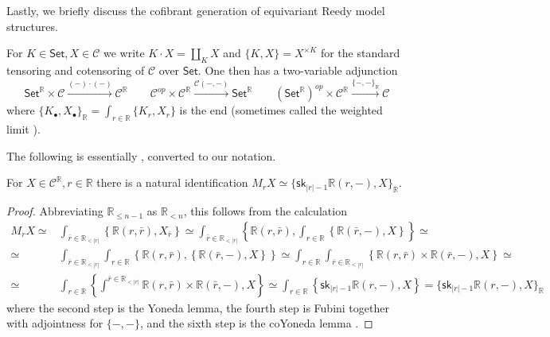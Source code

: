 \documentclass[a4paper,10pt
 ,draft
]{article}%
\begin{document}
Lastly, we briefly discuss the cofibrant generation of equivariant Reedy model structures.

For $K\in \mathsf{Set}, X \in \mathcal{C}$ we write
$K \cdot X = \coprod_K X$ and
$\{K,X\}=X^{\times K}$ for the standard tensoring and cotensoring of $\mathcal{C}$ over $\mathsf{Set}$. One then has a two-variable adjunction
\[
	\mathsf{Set}^{\mathbb{R}} \times \mathcal{C}
	\xrightarrow{(-)\cdot(-)}
	\mathcal{C}^{\mathbb{R}}
\qquad
	\mathcal{C}^{op} \times  \mathcal{C}^{\mathbb{R}}
	\xrightarrow{\mathcal{C}(-,-)}
	\mathsf{Set}^{\mathbb{R}}
\qquad
	\left(\mathsf{Set}^{\mathbb{R}}\right)^{op} \times \mathcal{C}^{\mathbb{R}}
	\xrightarrow{\{-,-\}_{\mathbb{R}}}
	\mathcal{C}
\]
where 
$\{K_{\bullet},X_{\bullet}\}_{\mathbb{R}} =
 \int_{r \in \mathbb{R}} \{K_r,X_r\}$
 is the end (sometimes called the weighted limit \cite[\S 7.1]{Ri14}).



The following is essentially \cite[Lemma 3.5]{RV14}, converted to our notation.


\begin{lemma} For $X \in \mathcal{C}^{\mathbb{R}}, r \in \mathbb{R}$ there is a natural identification
$
M_r X \simeq \{\mathsf{sk}_{|r|-1} \mathbb{R}(r,-),X \}_{\mathbb{R}}
$.
\end{lemma}

\begin{proof}
Abbreviating $\mathbb{R}_{\leq n-1}$ as $\mathbb{R}_{<n}$, this follows from the calculation
\begin{align}
	M_r X 
\simeq &
	\int_{\bar{r} \in \mathbb{R}_{<|r|}} 
\left\{\mathbb{R}(r,\bar{r}),X_{\bar{r}}\right\}
\simeq
	\int_{\bar{r} \in \mathbb{R}_{<|r|}} 
\left\{\mathbb{R}(r,\bar{r}),
	\int_{r \in \mathbb{R}} \left\{\mathbb{R}(\bar{r},-) ,X \right\}\right\}\simeq
\\
\simeq&
	\int_{\bar{r} \in \mathbb{R}_{<|r|}} \int_{r \in \mathbb{R}}
\left\{\mathbb{R}(r,\bar{r}),
	\left\{\mathbb{R}(\bar{r},-) ,X \right\}\right\}
\simeq
	\int_{r \in \mathbb{R}} \int_{\bar{r} \in \mathbb{R}_{<|r|}}
\left\{\mathbb{R}(r,\bar{r})\times \mathbb{R}(\bar{r},-) ,X \right\}\simeq
\\
\simeq &
	\int_{r \in \mathbb{R}} 
\left\{\int^{\bar{r} \in \mathbb{R}_{<|r|}}\mathbb{R}(r,\bar{r})\times \mathbb{R}(\bar{r},-) ,X \right\}
\simeq
	\int_{r \in \mathbb{R}} 
\left\{\mathsf{sk}_{|r|-1} \mathbb{R}(r,-) ,X \right\} =
\{\mathsf{sk}_{|r|-1} \mathbb{R}(r,-),X \}_{\mathbb{R}} 
\end{align}
where the second step is the Yoneda lemma, the fourth step is Fubini together with adjointness for $\{-,-\}$, and the sixth step is the coYoneda lemma \cite[Ex. 1.4.6]{Ri14}.
\end{proof}
\end{document}
